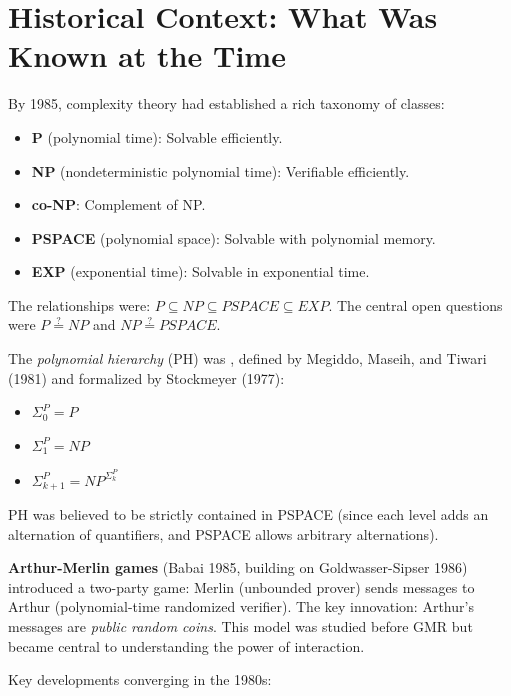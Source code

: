 \section{Historical Context: What Was Known at the Time}
\label{sec:ip:context}

By 1985, complexity theory had established a rich taxonomy of classes:
\begin{itemize}
\item \textbf{P} (polynomial time): Solvable efficiently.
\item \textbf{NP} (nondeterministic polynomial time): Verifiable efficiently.
\item \textbf{co-NP}: Complement of NP.
\item \textbf{PSPACE} (polynomial space): Solvable with polynomial memory.
\item \textbf{EXP} (exponential time): Solvable in exponential time.
\end{itemize}
The relationships were: $P \subseteq NP \subseteq PSPACE \subseteq EXP$. The central open questions were $P \stackrel{?}{=} NP$ and $NP \stackrel{?}{=} PSPACE$.

The \emph{polynomial hierarchy} (PH) was \cite{stockmeyer1976}, defined by Megiddo, Maseih, and Tiwari (1981) and formalized by Stockmeyer (1977):
\begin{itemize}
\item $\Sigma_0^P = P$
\item $\Sigma_1^P = NP$
\item $\Sigma_{k+1}^P = NP^{\Sigma_k^P}$
\end{itemize}
PH was believed to be strictly contained in PSPACE (since each level adds an alternation of quantifiers, and PSPACE allows arbitrary alternations).

\textbf{Arthur-Merlin games} (Babai 1985, building on Goldwasser-Sipser 1986) introduced a two-party game: Merlin (unbounded prover) sends messages to Arthur (polynomial-time randomized verifier). The key innovation: Arthur's messages are \emph{public random coins}. This model was studied before GMR but became central to understanding the power of interaction.

Key developments converging in the 1980s:

